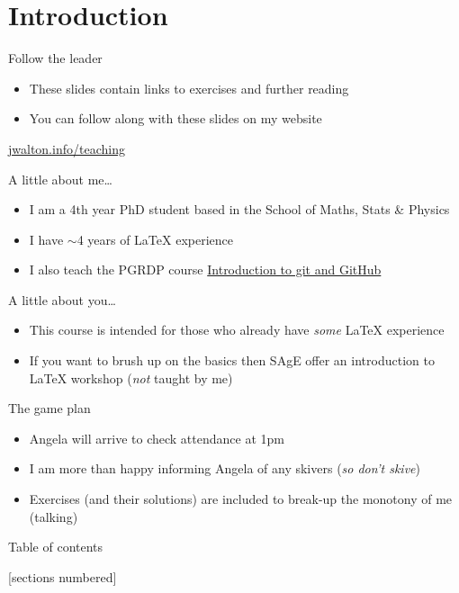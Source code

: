 \section*{Introduction}

\begin{frame}{Follow the leader}
  \begin{itemize}
    \item These slides contain links to exercises and further reading
    \item You can follow along with these slides on my website
  \end{itemize}  
  \centering\Large \href{https://jwalton.info/teaching/}{jwalton.info/teaching}
\end{frame}

\begin{frame}{A little about me\ldots}
  \begin{itemize}
    \item I am a 4th year PhD student based in the School of Maths, Stats
      \& Physics
    \item I have $\sim$4 years of \LaTeX{} experience
    \item I also teach the PGRDP course
      \href{https://workshops.ncl.ac.uk/view/book/modal/43153/}%
      {Introduction to git and GitHub}
  \end{itemize}
\end{frame}

\begin{frame}{A little about you\ldots}
  \begin{itemize}
    \item This course is intended for those who already have \emph{some} \LaTeX{} 
      experience
    \item If you want to brush up on the basics then SAgE offer an
      introduction to \LaTeX{} workshop (\emph{not} taught by me)
  \end{itemize}
\end{frame}

\begin{frame}{The game plan}
  \begin{itemize}
    \item Angela will arrive to check attendance at 1pm
    \item I am more than happy informing Angela of any skivers 
      (\emph{so don't skive})
    \item Exercises (and their solutions) are included to break-up the monotony
      of me (talking)
  \end{itemize}
\end{frame}

\begin{frame}{Table of contents}
  [sections numbered]
  \tableofcontents[hideallsubsections]
\end{frame}

